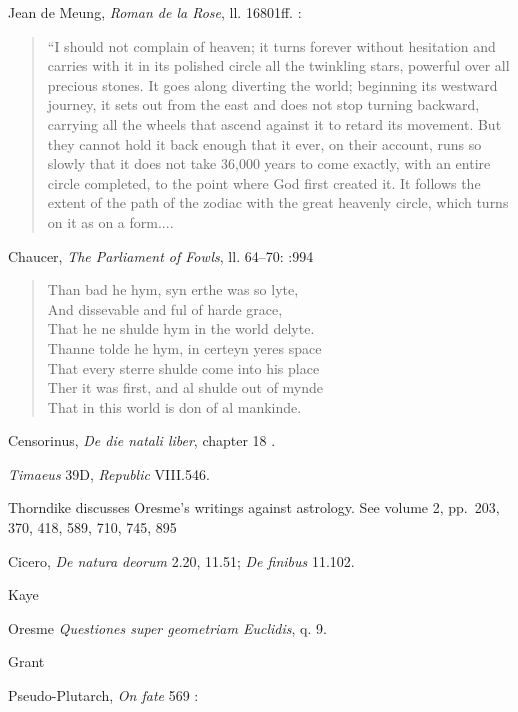 \documentclass{amsart}
\theoremstyle{definition}
\begin{document}
Jean de Meung, {\em Roman de la Rose}, ll. 16801ff. \cite[pp.~282--283]{dahlberg}:

\begin{quote}
``I should not complain of heaven; it turns forever without hesitation and carries with it in its polished circle all the twinkling stars, powerful over all precious
stones. It goes along diverting the world; beginning its westward journey, it sets out from the east and does not stop turning backward, carrying all the wheels
that ascend against it to retard its movement. But they cannot hold it back enough that it ever, on their account, runs so slowly that it does not take
36,000 years to come exactly, with an entire circle completed, to the point where God first created it. It follows the extent of the path of the zodiac
with the great heavenly circle, which turns on it as on a form....
\end{quote}

Chaucer, {\em The Parliament of Fowls}, ll. 64--70: \cite[p.~386]{chaucer}:994

\begin{quote}
Than bad he hym, syn erthe was so lyte,\\
And dissevable and ful of harde grace,\\
That he ne shulde hym in the world delyte.\\
Thanne tolde he hym, in certeyn yeres space\\
That every sterre shulde come into his place\\
Ther it was first, and al shulde out of mynde\\
That in this world is don of al mankinde.
\end{quote}


Censorinus, {\em De die natali liber}, chapter 18 \cite{censorinus}.

{\em Timaeus} 39D, {\em Republic} VIII.546.

Thorndike \cite[pp.~398--423, Chapter XXV]{magicIII} discusses Oresme's writings against astrology.
See volume 2, pp.~203, 370, 418, 589, 710, 745, 895

Cicero, {\em De natura deorum} 2.20, 11.51; {\em De finibus} 11.102.

Kaye \cite[pp.~430--442]{kaye}

Oresme {\em Questiones super geometriam Euclidis}, q. 9.

Grant \cite[pp.~288--313]{grant1971}

Pseudo-Plutarch, {\em On fate} 569 \cite[p.~317]{moraliaVII}:
\end{document}

